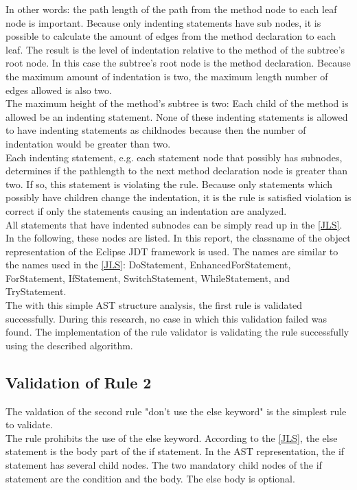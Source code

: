 In other words: the path length of the path from the method node to each leaf node is important. Because only indenting statements have sub nodes, it is possible to calculate the amount of edges from the method declaration to each leaf. The result is the level of indentation relative to the method of the subtree's root node. In this case the subtree's root node is the method declaration. Because the maximum amount of indentation is two, the maximum length number of edges allowed is also two.
\\

The maximum height of the method's subtree is two: Each child of the method is allowed be an indenting statement. None of these indenting statements is allowed to have indenting statements as childnodes because then the number of indentation would be greater than two. 
\\

Each indenting statement, e.g. each statement node that possibly has subnodes, determines if the pathlength to the next method declaration node is greater than two. If so, this statement is violating the rule. Because only statements which possibly have children change the indentation, it is the rule is satisfied violation is correct if only the statements causing an indentation are analyzed.
\\

All statements that have indented subnodes can be simply read up in the \ref{JLS}. In the following, these nodes are listed. In this report, the classname of the object representation of the Eclipse \acf{JDT} framework is used. The names are similar to the names used in the \ref{JLS}: DoStatement, EnhancedForStatement, ForStatement, IfStatement, SwitchStatement, WhileStatement, and TryStatement. 
\\

The with this simple \acf{AST} structure analysis, the first rule is validated successfully. During this research, no case in which this validation failed was found. The implementation of the rule validator is validating the rule successfully using the described algorithm.

\subsection*{Validation of Rule 2}
The valdation of the second rule "don’t use the else keyword" is the simplest rule to validate.
\\

The rule prohibits the use of the else keyword. According to the \ref{JLS}, the else statement is the body part of the if statement. In the \acf{AST} representation, the if statement has several child nodes. The two mandatory child nodes of the if statement are the condition and the body. The else body is optional. 
\\

